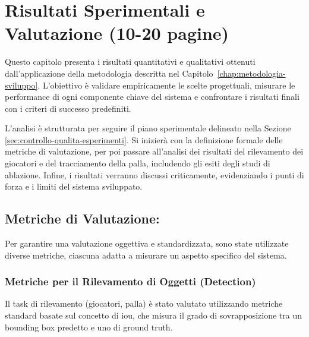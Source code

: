 \documentclass[12pt,a4paper,openright,twoside]{book}
\begin{document}
\chapter{Risultati Sperimentali e Valutazione (10-20 pagine)}
\label{chap:risultati-sperimentali}

Questo capitolo presenta i risultati quantitativi e qualitativi ottenuti dall'applicazione della metodologia 
descritta nel Capitolo~\ref{chap:metodologia-sviluppo}. L'obiettivo è validare empiricamente le scelte progettuali, 
misurare le performance di ogni componente chiave del sistema e confrontare i risultati finali con i criteri di 
successo predefiniti.

L'analisi è strutturata per seguire il piano sperimentale delineato nella Sezione \ref{sec:controllo-qualita-esperimenti}. 
Si inizierà con la definizione formale delle metriche di valutazione, per poi passare all'analisi dei risultati 
del rilevamento dei giocatori e del tracciamento della palla, includendo gli esiti degli studi di ablazione. 
Infine, i risultati verranno discussi criticamente, evidenziando i punti di forza e i limiti del sistema sviluppato.

\section{Metriche di Valutazione:}
\label{sec:metriche-valutazione}
Per garantire una valutazione oggettiva e standardizzata, sono state utilizzate diverse metriche, ciascuna adatta 
a misurare un aspetto specifico del sistema.

\subsection{Metriche per il Rilevamento di Oggetti (Detection)}
\label{sec:metriche-detection}
Il task di rilevamento (giocatori, palla) è stato valutato utilizzando metriche standard basate sul concetto di 
\ac{iou}, che misura il grado di sovrapposizione tra un bounding box predetto e uno di ground truth.
\end{document}

